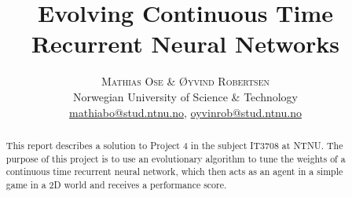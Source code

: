 \documentclass[twoside]{article}
\title{\vspace{-15mm}\fontsize{18pt}{10pt}\selectfont\textbf{Evolving Continuous Time Recurrent Neural Networks}} %
\author{
    \large
    \textsc{Mathias Ose \& Øyvind Robertsen} \\ %
    \normalsize Norwegian University of Science \& Technology \\ %
    \normalsize \href{mailto:mathiabo@stud.ntnu.no}{mathiabo@stud.ntnu.no}, \href{mailto:oyvinrob@stud.ntnu.no}{oyvinrob@stud.ntnu.no} %
    \vspace{-5mm}
}
\date{}
\begin{document}
\maketitle %

\thispagestyle{fancy} %


\begin{abstract}

    \noindent This report describes a solution to Project 4 in the subject IT3708 at NTNU. 
    The purpose of this project is to use an evolutionary algorithm to tune the weights of a continuous time recurrent neural network, which then acts as an agent in a simple game in a 2D world and receives a performance score.
\end{abstract}

\end{document}
